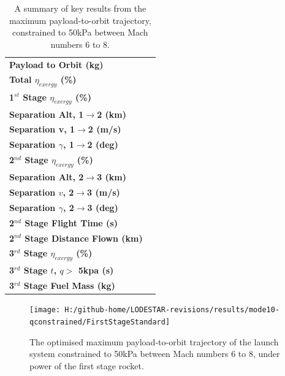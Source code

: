 \begin{table}[ht]
\begin{tabular}{l c }
	\\
	\hline \textbf{Payload to Orbit (kg)}
	& \textbf{\PayloadToOrbitqconstrainedNoReturn}
	\\
	\textbf{Total $\eta_{exergy}$ (\%)}
	& \textbf{\totalExergyEffqconstrainedNoReturn}
	\\
	\hline 
	\textbf{1$^{st}$ Stage $\eta_{exergy}$ (\%)}
	& \textbf{\firstExergyEffqconstrainedNoReturn}
	\\
	\textbf{Separation Alt, 1$\rightarrow$2 (km)}
	& \firstsecondSeparationAltqconstrainedNoReturn
	\\
	\textbf{Separation v, 1$\rightarrow$2 (m/s)}
	& \firstsecondSeparationvqconstrainedNoReturn
	\\
	\textbf{Separation $\gamma$, 1$\rightarrow$2 (deg)}
	& \firstsecondSeparationgammaqconstrainedNoReturn
	\\
	\hline 
	\textbf{2$^{nd}$ Stage $\eta_{exergy}$ (\%)}
	& \textbf{\secondExergyEffqconstrainedNoReturn}
	\\
	\textbf{Separation Alt, 2$\rightarrow$3 (km)}
	& \secondthirdSeparationAltqconstrainedNoReturn
	\\
	\textbf{Separation $v$, 2$\rightarrow$3 (m/s)}
	& \secondthirdSeparationvqconstrainedNoReturn
	\\
	\textbf{Separation $\gamma$, 2$\rightarrow$3 (deg)}
	& \secondthirdSeparationgammaqconstrainedNoReturn
	\\
	\textbf{2$^{nd}$ Stage Flight Time (s)}
	& \secondFlightTimeqconstrainedNoReturn
	\\
	\textbf{2$^{nd}$ Stage Distance Flown (km)}
	& \SecondDistqconstrainedNoReturn
	\\
	\hline 
	\textbf{3$^{rd}$ Stage $\eta_{exergy}$ (\%)}
	& \textbf{\thirddExergyEffqconstrainedNoReturn}
	\\
	\textbf{3$^{rd}$ Stage $t$, $q >$ 5kpa (s)}
	& \thirdqOverFiveqconstrainedNoReturn
	\\
	\textbf{3$^{rd}$ Stage Fuel Mass (kg)}
	& \thirdmFuelqconstrainedNoReturn
	\\
	\hline 
\end{tabular} 
\caption{A summary of key results from the maximum payload-to-orbit trajectory, constrained to 50kPa between Mach numbers 6 to 8.}
\label{tab:constrained68}

	\end{table}
		
\begin{figure}[th]
\centering
\texttt{[image: H:/github-home/LODESTAR-revisions/results/mode10-qconstrained/FirstStageStandard]}
\caption{The optimised maximum payload-to-orbit trajectory of the launch system constrained to 50kPa between Mach numbers 6 to 8, under power of the first stage rocket.}
\label{fig:FirstStageqConstrained68}
\end{figure}
		
